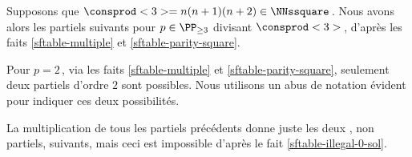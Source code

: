 Supposons que $\consprod<3> = n(n+1)(n+2) \in \NNssquare$\,. Nous avons alors les \sftab[x] partiels suivants pour $p \in \PP_{\geq 3}$ divisant $\consprod<3>$\,, d'après les faits \ref{sftable-multiple} et \ref{sftable-parity-square}.

\begin{center}
\end{center}


Pour $p = 2$\,, via les faits \ref{sftable-multiple} et \ref{sftable-parity-square}, seulement deux \sftab[x] partiels d'ordre $2$ sont possibles. Nous utilisons un abus de notation évident pour indiquer ces deux possibilités.

\begin{center}
\end{center}


La multiplication de tous les \sftab[x] partiels précédents donne juste les deux \sftab[x], non partiels, suivants, mais ceci est impossible d'après le fait \ref{sftable-illegal-0-sol}.

\begin{center}
\end{center}
